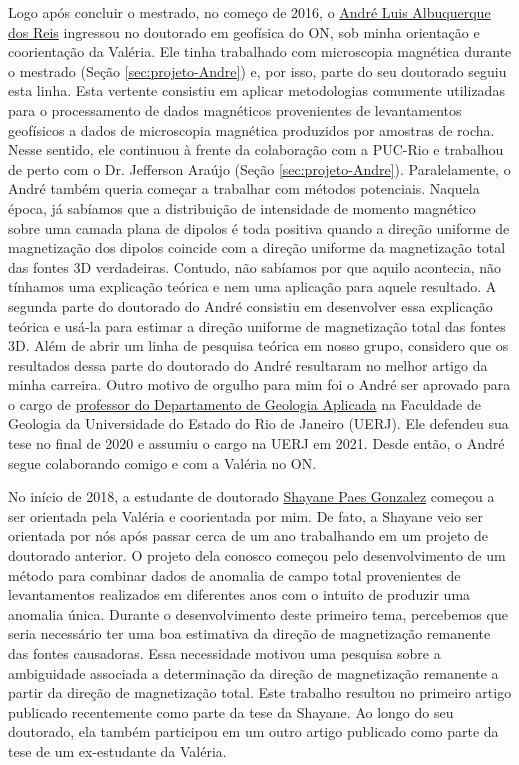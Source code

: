 Logo após concluir o mestrado, no começo de 2016, o
\href{https://lattes.cnpq.br/1075610796165589}{André Luis Albuquerque dos Reis}
ingressou no doutorado em geofísica do ON, sob minha orientação e coorientação da
Valéria. Ele tinha trabalhado com microscopia magnética durante o
mestrado (Seção \ref{sec:projeto-Andre}) e, por isso, parte do seu doutorado seguiu esta
linha. Esta vertente consistiu em aplicar metodologias comumente utilizadas para o
processamento de dados magnéticos provenientes de levantamentos geofísicos a dados de
microscopia magnética produzidos por amostras de rocha. Nesse sentido, ele continuou à 
frente da colaboração com a PUC-Rio e trabalhou de perto com o Dr. Jefferson Araújo
(Seção \ref{sec:projeto-Andre}).
Paralelamente, o André também queria começar a trabalhar com métodos potenciais.
Naquela época, já sabíamos que a distribuição de intensidade de momento magnético sobre
uma camada plana de dipolos é toda positiva quando a direção uniforme de magnetização dos
dipolos coincide com a direção uniforme da magnetização total das fontes 3D verdadeiras.
Contudo, não sabíamos por que aquilo acontecia, não tínhamos uma explicação teórica e
nem uma aplicação para aquele resultado. 
A segunda parte do doutorado do André consistiu em desenvolver
essa explicação teórica e usá-la para estimar a direção uniforme de magnetização total 
das fontes 3D. Além de abrir um linha de pesquisa teórica em nosso grupo, considero
que os resultados dessa parte do doutorado do André resultaram no melhor artigo da minha
carreira. Outro motivo de orgulho para mim foi o André ser aprovado para o cargo de
\href{https://www.fgel.uerj.br/site/departamentos/depto-de-geologia-aplicada/dgap-quadro-de-pessoal/}{professor do Departamento de Geologia Aplicada} 
na Faculdade de Geologia da Universidade do Estado do Rio de Janeiro (UERJ).
Ele defendeu sua tese no final de 2020 e assumiu o cargo na UERJ em 2021.
Desde então, o André segue colaborando comigo e com a Valéria no ON.

\bigskip

\noindent No início de 2018, a estudante de doutorado 
\href{https://lattes.cnpq.br/5954916221599872}{Shayane Paes Gonzalez}
começou a ser orientada pela Valéria e coorientada por mim. 
De fato, a Shayane veio ser orientada por nós após passar cerca de um ano trabalhando 
em um projeto de doutorado anterior. 
O projeto dela conosco começou pelo desenvolvimento de um método para combinar dados
de anomalia de campo total provenientes de levantamentos realizados em diferentes anos
com o intuito de produzir uma anomalia única. Durante o desenvolvimento deste primeiro tema,
percebemos que seria necessário ter uma boa estimativa da direção de magnetização remanente
das fontes causadoras. Essa necessidade motivou uma pesquisa sobre a ambiguidade associada 
a determinação da direção de magnetização remanente a partir da direção de magnetização
total. Este trabalho resultou no primeiro artigo publicado recentemente como parte da tese
da Shayane.
Ao longo do seu doutorado, ela também participou em um outro artigo publicado como parte
da tese de um ex-estudante da Valéria. 

